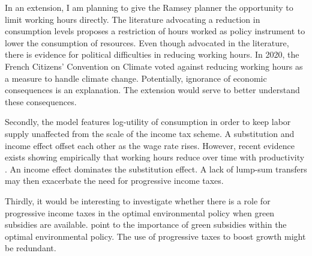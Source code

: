 In an extension, I am planning to give the Ramsey planner the opportunity to limit working hours directly. The literature advocating a reduction in consumption levels \citep[e.g.,][]{Schor2005SustainableReductionb} proposes a restriction of hours worked as policy instrument to lower the consumption of resources.
Even though advocated in the literature, there is evidence for political difficulties in reducing working hours. In 2020, the French Citizens' Convention on Climate voted against reducing working hours as a measure to handle climate change. Potentially, ignorance of economic consequences is an explanation. The extension would serve to better understand these consequences.

Secondly, the model features log-utility of consumption in order to keep labor supply unaffected from the scale of the income tax scheme. A substitution and income effect offset each other as the wage rate rises.  However, recent evidence exists showing empirically that working hours reduce over time with productivity \citep{Boppart2019LaborPerspectiveb}. An income effect dominates the substitution effect. A lack of lump-sum transfers may then exacerbate the need for progressive income taxes. 

Thirdly, it would be interesting to investigate whether there is a role for progressive income taxes in the optimal environmental policy when green subsidies are available. \cite{Acemoglu2012TheChange} point to the importance of green subsidies within the optimal environmental policy. The use of progressive taxes to boost growth might be redundant. %
